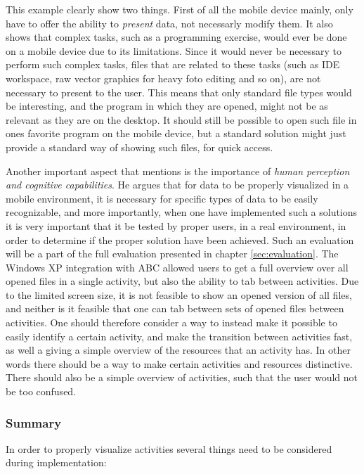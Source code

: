 This example clearly show two things. First of all the mobile device mainly, only have to offer the ability to \emph{present} data, not necessarly modify them. It also shows that complex tasks, such as a programming exercise, would ever be done on a mobile device due to its limitations. Since it would never be necessary to perform such complex tasks, files that are related to these tasks (such as IDE workspace, raw vector graphics for heavy foto editing and so on), are not necessary to present to the user. This means that only standard file types would be interesting, and the program in which they are opened, might not be as relevant as they are on the desktop. It should still be possible to open such file in ones favorite program on the mobile device, but a standard solution might just provide a standard way of showing such files, for quick access.

Another important aspect that \citet{chittaro} mentions is the importance of \emph{human perception and cognitive capabilities}. He argues that for data to be properly visualized in a mobile environment, it is necessary for specific types of data to be easily recognizable, and more importantly, when one have implemented such a solutions it is very important that it be tested by proper users, in a real environment, in order to determine if the proper solution have been achieved. Such an evaluation will be a part of the full evaluation presented in chapter \ref{sec:evaluation}. The Windows XP integration with ABC allowed users to get a full overview over all opened files in a single activity, but also the ability to tab between activities. Due to the limited screen size, it is not feasible to show an opened version of all files, and neither is it feasible that one can tab between sets of opened files between activities. One should therefore consider a way to instead make it possible to easily identify a certain activity, and make the transition between activities fast, as well a giving a simple overview of the resources that an activity has. In other words there should be a way to make certain activities and resources distinctive. There should also be a simple overview of activities, such that the user would not be too confused.

\subsubsection{Summary}
In order to properly visualize activities several things need to be considered during implementation:

